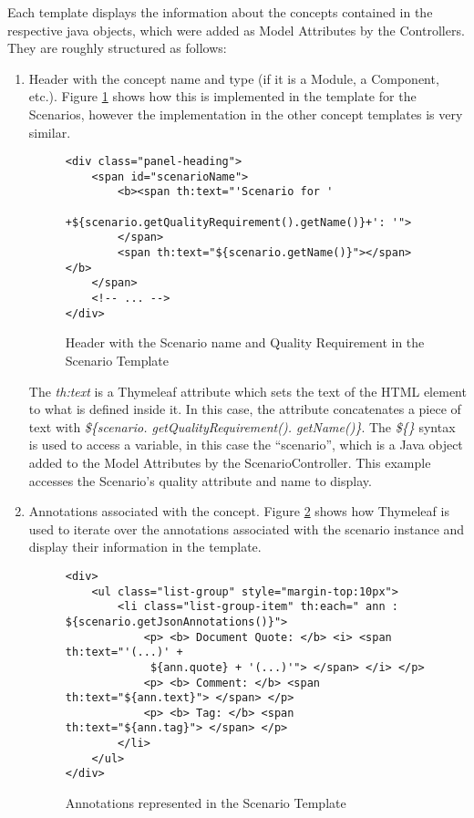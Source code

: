 Each template displays the information about the concepts contained in the respective java objects, which were added as Model Attributes by the Controllers. They are roughly structured as follows:
\begin{enumerate}
\item Header with the concept name and type (if it is a Module, a Component, etc.). Figure \ref{figure:ScenarioTemplateName} shows how this is implemented in the template for the Scenarios, however the implementation in the other concept templates is very similar.
 
\begin{figure}[h]
\lstset{style=customhtml}
\begin{lstlisting}
<div class="panel-heading">
	<span id="scenarioName">
		<b><span th:text="'Scenario for '
			+${scenario.getQualityRequirement().getName()}+': '">
		</span>
		<span th:text="${scenario.getName()}"></span></b>
	</span>
	<!-- ... -->
</div>	
\end{lstlisting}
\caption{Header with the Scenario name and Quality Requirement in the Scenario Template}
\label{figure:ScenarioTemplateName}
\end{figure}

The \textit{th:text} is a Thymeleaf attribute which sets the text of the HTML element to what is defined inside it. In this case, the attribute concatenates a piece of text with \textit{\$\{scenario. getQualityRequirement(). getName()\}}. The \textit{\$\{\}} syntax is used to access a variable, in this case the ``scenario'', which is a Java object added to the Model Attributes by the ScenarioController. This example accesses the Scenario's quality attribute and name to display.


\item Annotations associated with the concept. Figure \ref{figure:ScenarioTemplateAnnotations} shows how Thymeleaf is used to iterate over the annotations associated with the scenario instance and display their information in the template.
\begin{figure}[h]
\lstset{style=customhtml}
\begin{lstlisting}
<div>
	<ul class="list-group" style="margin-top:10px">
		<li class="list-group-item" th:each=" ann : ${scenario.getJsonAnnotations()}">
			<p> <b> Document Quote: </b> <i> <span th:text="'(...)' +
			 ${ann.quote} + '(...)'"> </span> </i> </p>
			<p> <b> Comment: </b> <span th:text="${ann.text}"> </span> </p>
			<p> <b> Tag: </b> <span th:text="${ann.tag}"> </span> </p>
		</li>
	</ul>
</div>	
\end{lstlisting}
\caption{Annotations represented in the Scenario Template}
\label{figure:ScenarioTemplateAnnotations}
\end{figure}


\end{enumerate}
